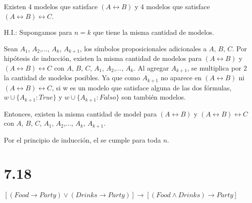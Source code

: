 \documentclass[spanish]{article}
\begin{document}
Existen 4 modelos que satisface $(A\leftrightarrow B)$ y 4 modelos que satisface $(A\leftrightarrow B)\leftrightarrow C$.

H.I.: Supongamos para $n=k$ que tiene la misma cantidad de modelos.

Sean $A_1$, $A_2$,..., $A_k$, $A_{k+1}$, los símbolos proposicionales adicionales a $A$, $B$, $C$.
Por hipótesis de inducción, existen la misma cantidad de modelos para $(A\leftrightarrow B)$ y $(A\leftrightarrow B)\leftrightarrow C$ con $A$, $B$, $C$, $A_1$, $A_2$,..., $A_k$.
Al agregar $A_{k+1}$, se multiplica por 2 la cantidad de modelos posibles. Ya que como $A_{k+1}$ no aparece en $(A\leftrightarrow B)$ ni $(A\leftrightarrow B)\leftrightarrow C$, si w es un modelo que satisface alguna de las dos fórmulas, $w\cup\{A_{k+1}:True\}$ y $w\cup\{A_{k+1}:Falso\}$ son también modelos.

Entonces, existen la misma cantidad de model para $(A\leftrightarrow B)$ y $(A\leftrightarrow B)\leftrightarrow C$ con $A$, $B$, $C$, $A_1$, $A_2$,..., $A_k$, $A_{k+1}$.

Por el principio de inducción, el se cumple para toda $n$.

\section*{7.18}

$[(Food \rightarrow Party)\vee(Drinks\rightarrow Party)] \rightarrow [(Food \wedge Drinks)\rightarrow Party]$
\end{document}
